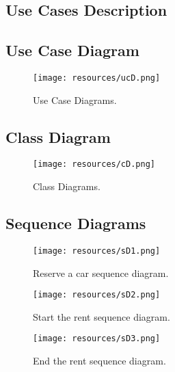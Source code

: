 \subsection{Use Cases Description}


\newpage
\subsection{Use Case Diagram}

\begin{figure}[hp]
\centering
\texttt{[image: resources/ucD.png]}
\caption{\label{fig:ucD}Use Case Diagrams.}
\end{figure}

\newpage
\subsection{Class Diagram}

\begin{figure}[hp]
\centering
\texttt{[image: resources/cD.png]}
\caption{\label{fig:cD}Class Diagrams.}
\end{figure}

\newpage
\subsection{Sequence Diagrams}

\begin{figure}[hp]
\centering
\texttt{[image: resources/sD1.png]}
\caption{\label{fig:sD1}Reserve a car sequence diagram.}
\end{figure}

\begin{figure}[hp]
\centering
\texttt{[image: resources/sD2.png]}
\caption{\label{fig:sD2}Start the rent sequence diagram.}
\end{figure}

\begin{figure}[hp]
\centering
\texttt{[image: resources/sD3.png]}
\caption{\label{fig:sD3}End the rent sequence diagram.}
\end{figure}
